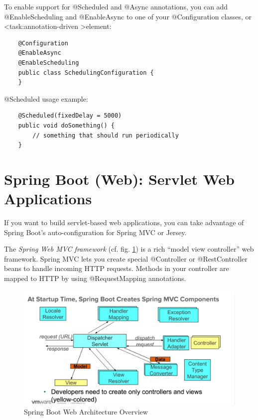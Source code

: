 \documentclass{scrartcl}
\begin{document}
To enable support for @Scheduled and @Async annotations, you can add @EnableScheduling and @EnableAsync to one of your @Configuration classes, or \textless task:annotation-driven \textgreater element:

\begin{lstlisting}
    @Configuration
    @EnableAsync
    @EnableScheduling
    public class SchedulingConfiguration {
    }

\end{lstlisting}

@Scheduled usage example:

\begin{lstlisting}
    @Scheduled(fixedDelay = 5000)
    public void doSomething() {
        // something that should run periodically
    }
\end{lstlisting}

\section{Spring Boot (Web): Servlet Web Applications}

If you want to build servlet-based web applications, you can take advantage of Spring Boot’s auto-configuration for Spring MVC or Jersey.

The \textit{Spring Web MVC framework} (cf. fig. \ref{fig:spring-web}) is a rich “model view controller” web framework.
Spring MVC lets you create special @Controller or @RestController beans to handle incoming HTTP requests. Methods in your controller are mapped to HTTP by using @RequestMapping annotations.

\begin{figure}[h]
    \centering
    \includegraphics[width=1\linewidth]{spring-web}
    \caption{Spring Boot Web Architecture Overview}
    \label{fig:spring-web}
\end{figure}
\end{document}
